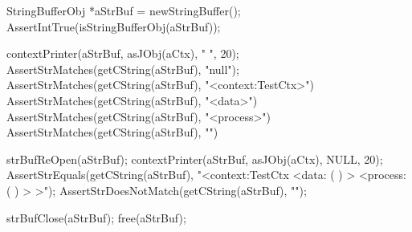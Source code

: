   StringBufferObj *aStrBuf = newStringBuffer();
  AssertIntTrue(isStringBufferObj(aStrBuf));
  
  contextPrinter(aStrBuf, asJObj(aCtx), "  ", 20);
  AssertStrMatches(getCString(aStrBuf), "null");
  AssertStrMatches(getCString(aStrBuf), "<context:TestCtx>")
  AssertStrMatches(getCString(aStrBuf), "<data>")
  AssertStrMatches(getCString(aStrBuf), "<process>")
  AssertStrMatches(getCString(aStrBuf), "\n")

  strBufReOpen(aStrBuf);
  contextPrinter(aStrBuf, asJObj(aCtx), NULL, 20);
  AssertStrEquals(getCString(aStrBuf), "<context:TestCtx   <data: (  )  > <process: (  )  > >");
  AssertStrDoesNotMatch(getCString(aStrBuf), "\n");
  
  strBufClose(aStrBuf);
  free(aStrBuf);
\stopCTest
\stopTestCase
\stopTestSuite